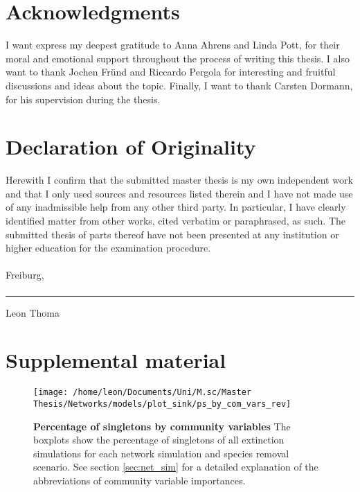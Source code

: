 \documentclass[12pt,a4paper]{article}
\begin{document}
\section{Acknowledgments}
I want express my deepest gratitude to Anna Ahrens and Linda Pott, for their moral and emotional support throughout the process of writing this thesis. I also want to thank Jochen Fründ and Riccardo Pergola for interesting and fruitful discussions and ideas about the topic. Finally, I want to thank Carsten Dormann, for his supervision during the thesis.
\newpage
\section*{Declaration of Originality}
Herewith I confirm that the submitted master thesis is my own independent work and that I only used sources and resources listed therein and I have not made use of any inadmissible help from any other third party. In particular, I have clearly identified matter from other works, cited verbatim or paraphrased, as such.
The submitted thesis of parts thereof have not been presented at any institution or higher education for the examination procedure.\paragraph{}

Freiburg,\paragraph{}

\rule{5cm}{.4pt}\par
Leon Thoma
\newpage
\section{Supplemental material}

\begin{figure}[H]
	 \centering
	 \texttt{[image: /home/leon/Documents/Uni/M.sc/Master Thesis/Networks/models/plot\_sink/ps\_by\_com\_vars\_rev]}
	 	 \captionsetup{width = .8\textwidth}
	 \caption[Percentage of singletons by community variables]{\textbf{Percentage of singletons by community variables} The boxplots show the percentage of singletons of all extinction simulations for each network simulation and species removal scenario. See section \ref{sec:net_sim} for a detailed explanation of the abbreviations of community variable importances.}
	 \label{fig:ps_by_cv}
\end{figure}
\end{document}
